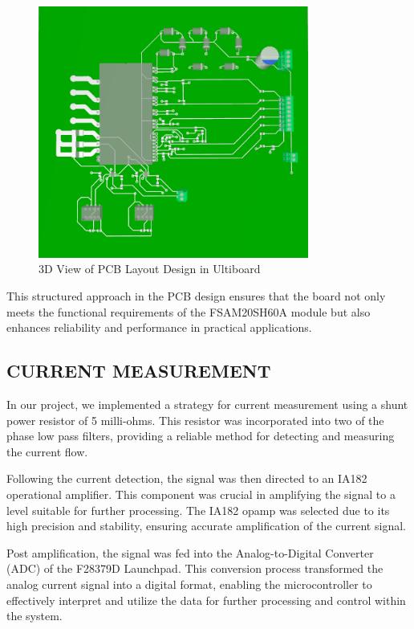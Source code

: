 \begin{figure}[H]
	\centering
	\includegraphics[width=3.5in]{sections/section4/images/PCBDesign/Ultiboard/3DTopView.png}
	\caption{3D View of PCB Layout Design in Ultiboard}
\end{figure}

This structured approach in the PCB design ensures that the board not only meets the functional requirements of the FSAM20SH60A module but also enhances reliability and performance in practical applications.

\subsection{CURRENT MEASUREMENT}

In our project, we implemented a strategy for current measurement using a shunt power resistor of 5 milli-ohms. This resistor was incorporated into two of the phase low pass filters, providing a reliable method for detecting and measuring the current flow.

Following the current detection, the signal was then directed to an IA182 operational amplifier. This component was crucial in amplifying the signal to a level suitable for further processing. The IA182 opamp was selected due to its high precision and stability, ensuring accurate amplification of the current signal.

Post amplification, the signal was fed into the Analog-to-Digital Converter (ADC) of the F28379D Launchpad. This conversion process transformed the analog current signal into a digital format, enabling the microcontroller to effectively interpret and utilize the data for further processing and control within the system. 




